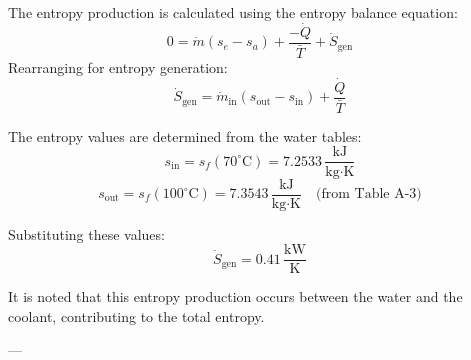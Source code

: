 The entropy production is calculated using the entropy balance equation:  
\[
0 = \dot{m} (s_e - s_a) + \frac{-\dot{Q}}{\bar{T}} + \dot{S}_{\text{gen}}
\]  
Rearranging for entropy generation:  
\[
\dot{S}_{\text{gen}} = \dot{m}_{\text{in}} (s_{\text{out}} - s_{\text{in}}) + \frac{\dot{Q}}{\bar{T}}
\]  

The entropy values are determined from the water tables:  
\[
s_{\text{in}} = s_f(70^\circ\text{C}) = 7.2533 \, \frac{\text{kJ}}{\text{kg·K}}
\]  
\[
s_{\text{out}} = s_f(100^\circ\text{C}) = 7.3543 \, \frac{\text{kJ}}{\text{kg·K}} \quad \text{(from Table A-3)}
\]  

Substituting these values:  
\[
\dot{S}_{\text{gen}} = 0.41 \, \frac{\text{kW}}{\text{K}}
\]  

It is noted that this entropy production occurs between the water and the coolant, contributing to the total entropy.  

---